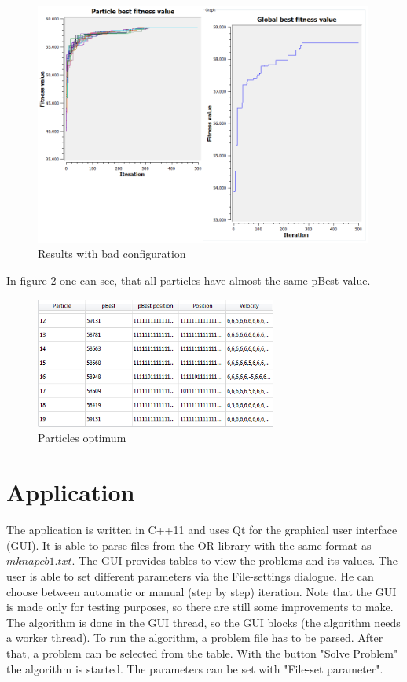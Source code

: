 \documentclass{article}
\begin{document}
\begin{figure}[H]
    \centering
    \includegraphics[width=420px]{images/p20_500it_p30_badConfig_both.png}
    \caption{Results with bad configuration}
    \label{fig-bad-config}
\end{figure}

In figure \ref{fig-particles_optimum} one can see, that all particles have almost the same pBest value.

\begin{figure}[H]
    \centering
    \includegraphics[width=300px]{images/particles_optimum2.PNG}
    \caption{Particles optimum}
    \label{fig-particles_optimum}
\end{figure}

\section{Application}
\label{lbl-app}
The application is written in C++11 and uses Qt for the graphical user interface (GUI). It is able to parse files from the OR library with the same format as $mknapcb1.txt$. The GUI   provides tables to view the problems and its values. The user is able to set different parameters via the File-settings dialogue. He can choose between automatic or manual (step by step) iteration. Note that the GUI is made only for testing purposes, so there are still some improvements to make. The algorithm is done in the GUI thread, so the GUI blocks (the algorithm needs a worker thread). To run the algorithm, a problem file has to be parsed. After that, a problem can be selected from the table. With the button "Solve Problem" the algorithm is started. The parameters can be set with "File-set parameter".
\end{document}
